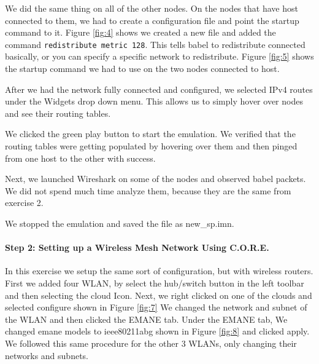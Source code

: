 \documentclass[main.tex]{subfiles}
\begin{document}
\noindent  We did the same thing on all of the other nodes.  On the nodes that have host connected to them, we had to create a configuration file and point the startup command to it.  
\noindent Figure \ref{fig:4} shows we created a new file and added the command \texttt{redistribute metric 128}.  This tells babel to redistribute connected basically, or you can specify a specific network to redistribute.
\noindent Figure \ref{fig:5} shows the startup command we had to use on the two nodes connected to host.


\noindent After we had the network fully connected and configured, we selected IPv4 routes under the Widgets drop down menu.  This allows us to simply hover over nodes and see their routing tables.

\noindent We clicked the green play button to start the emulation.  We verified that the routing tables were getting populated by hovering over them and then pinged from one host to the other with success.

\noindent  Next, we launched Wireshark on some of the nodes and observed babel packets. We did not spend much time analyze them, because they are the same from exercise 2.

\noindent We stopped the emulation and saved the file as new\_sp.imn.



\paragraph{Step 2: Setting up a Wireless Mesh Network Using C.O.R.E. }
\hfill \break
\noindent In this exercise we setup the same sort of configuration, but with wireless routers.
\noindent First we added four WLAN, by select the hub/switch button in the left toolbar and then selecting the cloud Icon.
\noindent Next, we right clicked on one of the clouds and selected configure shown in Figure \ref{fig:7}
\noindent We changed the network and subnet of the WLAN and then clicked the EMANE tab.  \noindent Under the EMANE tab, We changed emane models to ieee80211abg shown in Figure \ref{fig:8} and clicked apply.
\noindent We followed this same procedure for the other 3 WLANs, only changing their networks and subnets.
\end{document}
